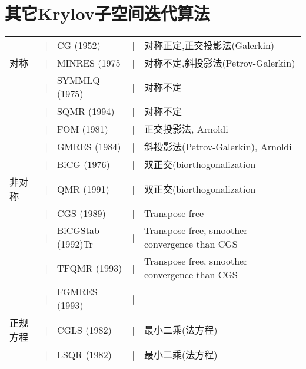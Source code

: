 \documentclass[12pt,a4paper]{article}
\begin{document}
\section{其它Krylov子空间迭代算法}
\begin{tabular}{lllll}
\hline
&|&CG (1952)&|&对称正定,正交投影法(Galerkin)\\
对称&|&MINRES (1975&|&对称不定,斜投影法(Petrov-Galerkin)\\
&|&SYMMLQ (1975)&|&对称不定\\
&|&SQMR (1994)&|&对称不定\\
\hline
&|&FOM (1981)&|&正交投影法, Arnoldi\\
&|&GMRES (1984)&|&斜投影法(Petrov-Galerkin), Arnoldi\\
&|&BiCG (1976)&|&双正交(biorthogonalization\\
非对称&|&QMR (1991)&|&双正交(biorthogonalization\\
&|&CGS (1989)&|&Transpose free\\
&|&BiCGStab (1992)Tr&|&Transpose free, smoother convergence than CGS\\
&|&TFQMR (1993)&|&Transpose free, smoother convergence than CGS\\
&|&FGMRES (1993)&|&{}\\
\hline
正规方程&|&CGLS (1982)&|&最小二乘(法方程)\\
&|&LSQR (1982)&|&最小二乘(法方程)\\
\hline
\end{tabular}









































\cite{tam19912d}

\end{document}
